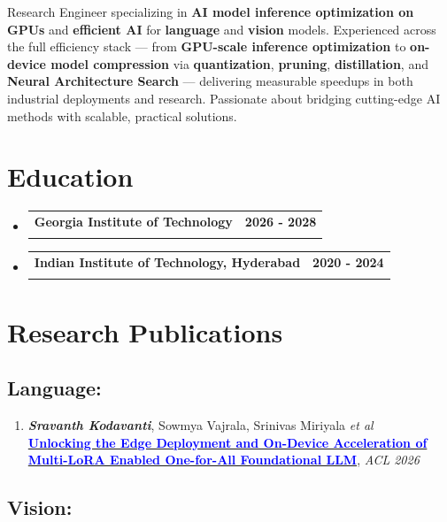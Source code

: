 \documentclass[letterpaper,11pt]{article}
\makeatletter
\newcommand{\resumeSubheading}[4]{
  \vspace{-2pt}\item
    \begin{tabular*}{1.0\textwidth}[t]{l@{\extracolsep{\fill}}r}
      \textbf{#1} & \textbf{\small #2} \\
      \text{\small#3} & \text{\small #4} \\
    \end{tabular*}\vspace{-7pt}
}
\newcommand{\resumeSubHeadingListStart}{\begin{itemize}[leftmargin=0.0in, label={}]}
\newcommand{\resumeSubHeadingListEnd}{\end{itemize}}
\makeatother
\begin{document}
Research Engineer specializing in \textbf{AI model inference optimization on GPUs} and \textbf{efficient AI} for \textbf{language} and \textbf{vision} models. Experienced across the full efficiency stack --- from \textbf{GPU-scale inference optimization} to \textbf{on-device model compression} via \textbf{quantization}, \textbf{pruning}, \textbf{distillation}, and \textbf{Neural Architecture Search} --- delivering measurable speedups in both industrial deployments and research. Passionate about bridging cutting-edge AI methods with scalable, practical solutions.



\section{Education}
  \resumeSubHeadingListStart
  \resumeSubheading
        {Georgia Institute of Technology} {2026 - 2028}
      {Master of Science, \textbf{Major} - Computer Science, \textbf{Specilization} - Computational Perception and Robotics}{}
    \resumeSubheading
      {Indian Institute of Technology, Hyderabad}{2020 - 2024}
      {Bachelor of Technology, \textbf{Major} - Computer Science and Engineering, \textbf{Minor} - Entrepreneurship}{CGPA - 8.58}
  \resumeSubHeadingListEnd

\section{Research Publications}

\subsection*{Language:}

\begin{enumerate}
    \item \textit{\textbf{Sravanth Kodavanti}}, Sowmya Vajrala, Srinivas Miriyala \textit{et al}\\
    \href{https://arxiv.org/abs/2604.18655}{\textcolor{Blue}{\textbf{Unlocking the Edge Deployment and On-Device Acceleration of Multi-LoRA Enabled One-for-All Foundational LLM}}},
    \textit{ACL 2026}
\end{enumerate}

\subsection*{Vision:}
\end{document}
